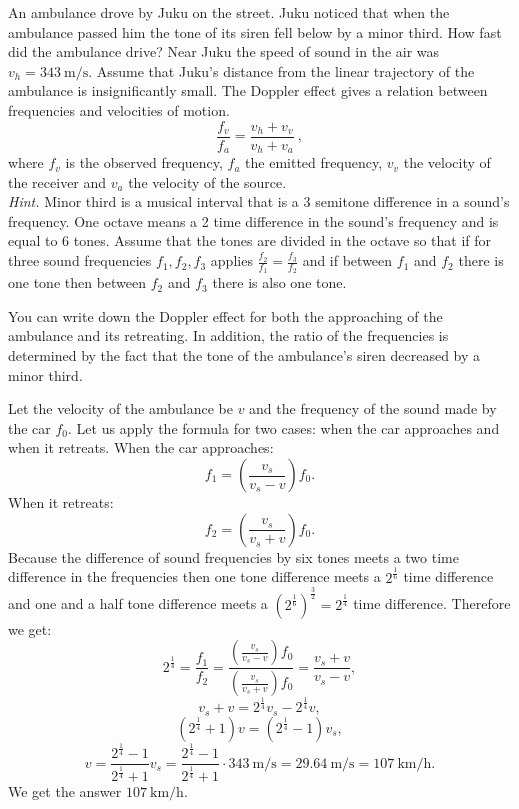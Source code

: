 An ambulance drove by Juku on the street. Juku noticed that when the ambulance passed him the tone of its siren fell below by a minor third. How fast did the ambulance drive? Near Juku the speed of sound in the air was $v_h = \SI{343}{\meter\per\second}$. Assume that Juku’s distance from the linear trajectory of the ambulance is insignificantly small. The Doppler effect gives a relation between frequencies and velocities of motion.
\[ \frac{f_v}{f_a} = \frac{v_h + v_v}{v_h + v_a} \ , \] 
where \(f_v\) is the observed frequency, \(f_a\) the emitted frequency, \(v_v\) the velocity of the receiver and \(v_a\) the velocity of the source. \\
\emph{Hint.} Minor third is a musical interval that is a 3 semitone difference in a sound’s frequency. One octave means a 2 time difference in the sound’s frequency and is equal to 6 tones. Assume that the tones are divided in the octave so that if for three sound frequencies $f_1, f_2, f_3$ applies $\frac{f_2}{f_1} = \frac{f_3}{f_2}$ and if between $f_1$ and $f_2$ there is one tone then between $f_2$ and $f_3$ there is also one tone.

\hinteng
You can write down the Doppler effect for both the approaching of the ambulance and its retreating. In addition, the ratio of the frequencies is determined by the fact that the tone of the ambulance’s siren decreased by a minor third.

\solueng
Let the velocity of the ambulance be $v$ and the frequency of the sound made by the car $f_0$. Let us apply the formula for two cases: when the car approaches and when it retreats. 
When the car approaches:
\[f_1 = \left(\frac{v_s}{v_s - v}\right)f_0.\]
When it retreats:
\[f_2 = \left(\frac{v_s}{v_s + v}\right)f_0.\]
Because the difference of sound frequencies by six tones meets a two time difference in the frequencies then one tone difference meets a $2^{\frac 1 6}$ time difference and one and a half tone difference meets a $\left(2^{\frac 1 6}\right)^{\frac 3 2} = 2^{\frac 1 4}$ time difference. Therefore we get:
\[2^{\frac 1 4} = \frac{f_1}{f_2} = \frac{(\frac{v_s}{v_s - v})f_0}{(\frac{v_s}{v_s + v})f_0} = \frac{v_s + v}{v_s - v},\]
\[v_s + v = 2^{\frac 1 4}v_s - 2^{\frac 1 4}v,\]
\[(2^{\frac 1 4} + 1)v = (2^{\frac 1 4} - 1)v_s,\]
\[v = \frac{2^{\frac 1 4} - 1}{2^{\frac 1 4} + 1}v_s = \frac{2^{\frac 1 4} - 1}{2^{\frac 1 4} + 1} \cdot \SI{343}{\meter\per\second} = \SI{29.64}{\meter\per\second} = \SI{107}{\kilo\meter\per\hour}. \]
We get the answer $\SI{107}{\kilo\meter\per\hour}$.
\probend